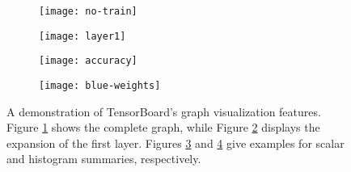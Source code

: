 \begin{figure}[h!]
  \centering
  \begin{subfigure}[h]{0.5\textwidth}
    \centering
    \texttt{[image: no-train]}
   \caption{}
   \label{fig:tensorboard-a}
  \end{subfigure}

  \vspace{0.3cm}

  \begin{subfigure}[h]{0.5\textwidth}
    \centering
    \texttt{[image: layer1]}
    \caption{}
    \label{fig:tensorboard-b}
  \end{subfigure}

  \vspace{0.3cm}

  \begin{subfigure}[h]{0.2\textwidth}
    \centering
    \texttt{[image: accuracy]}
    \caption{}
    \label{fig:tensorboard-c}
  \end{subfigure}
  \begin{subfigure}[h]{0.2\textwidth}
    \centering
    \texttt{[image: blue-weights]}
    \caption{}
    \label{fig:tensorboard-d}
  \end{subfigure}
  \caption{A demonstration of TensorBoard's graph visualization features. Figure
    \ref{fig:tensorboard-a} shows the complete graph, while Figure
    \ref{fig:tensorboard-b} displays the expansion of the first layer. Figures
    \ref{fig:tensorboard-c} and \ref{fig:tensorboard-d} give examples for scalar
    and histogram summaries, respectively.}
  \label{fig:tensorboard}
\end{figure}

